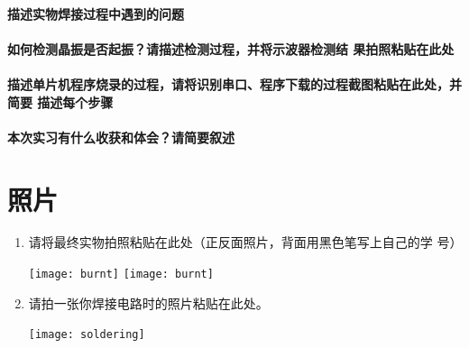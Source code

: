 \documentclass{swfulabreport}
\begin{document}
\paragraph{描述实物焊接过程中遇到的问题}

\zhlipsum[3-4]

\paragraph{如何检测晶振是否起振？请描述检测过程，并将示波器检测结
  果拍照粘贴在此处}

\zhlipsum[5-6]

\paragraph{描述单片机程序烧录的过程，请将识别串口、程序下载的过程截图粘贴在此处，并简要
描述每个步骤}

\zhlipsum[7-8]

\paragraph{本次实习有什么收获和体会？请简要叙述}

\zhlipsum[9-10]



\section{照片}

\begin{enumerate}
\item 请将最终实物拍照粘贴在此处（正反面照片，背面用黑色笔写上自己的学
  号）

  \begin{center}
    \texttt{[image: burnt]}\qquad
    \texttt{[image: burnt]}
  \end{center}

\item 请拍一张你焊接电路时的照片粘贴在此处。

  \begin{center}
    \texttt{[image: soldering]}
  \end{center}

\end{enumerate}

\lastpage
\end{document}

